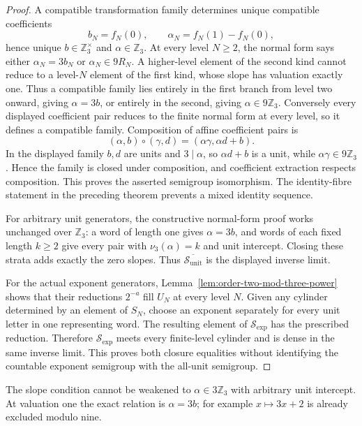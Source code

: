 \begin{proof}
A compatible transformation family determines unique compatible coefficients
\[
 b_N=f_N(0),
 \qquad \alpha_N=f_N(1)-f_N(0),
\]
hence unique $b\in\mathbb Z_3^\times$ and $\alpha\in\mathbb Z_3$.
At every level $N\geq2$, the normal form says either
$\alpha_N=3b_N$ or $\alpha_N\in9R_N$.  A higher-level element of the second
kind cannot reduce to a level-$N$ element of the first kind, whose slope has
valuation exactly one.  Thus a compatible family lies entirely in the first
branch from level two onward, giving $\alpha=3b$, or entirely in the second,
giving $\alpha\in9\mathbb Z_3$.  Conversely every displayed coefficient pair
reduces to the finite normal form at every level, so it defines a compatible
family.  Composition of affine coefficient pairs is
\[
 (\alpha,b)\circ(\gamma,d)=(\alpha\gamma,\alpha d+b).
\]
In the displayed family $b,d$ are units and $3\mid\alpha$, so
$\alpha d+b$ is a unit, while $\alpha\gamma\in9\mathbb Z_3$.  Hence the
family is closed under composition, and coefficient extraction respects
composition.  This proves the asserted semigroup isomorphism.  The
identity-fibre statement in the preceding theorem prevents a mixed identity
sequence.

For arbitrary unit generators, the constructive normal-form proof works
unchanged over $\mathbb Z_3$: a word of length one gives $\alpha=3b$, and
words of each fixed length $k\geq2$ give every pair with
$\nu_3(\alpha)=k$ and unit intercept.  Closing these strata adds exactly the
zero slopes.  Thus
$\overline{\mathcal S_{\mathrm{unit}}}$ is the displayed inverse limit.

For the actual exponent generators, Lemma~\ref{lem:order-two-mod-three-power}
shows that their reductions $2^{-a}$ fill $U_N$ at every level $N$.  Given
any cylinder determined by an element of $S_N$, choose an exponent separately
for every unit letter in one representing word.  The resulting element of
$\mathcal S_{\mathrm{exp}}$ has the prescribed reduction.  Therefore
$\mathcal S_{\mathrm{exp}}$ meets every finite-level cylinder and is dense in
the same inverse limit.  This proves both closure equalities without
identifying the countable exponent semigroup with the all-unit semigroup.
\end{proof}

The slope condition cannot be weakened to
$\alpha\in3\mathbb Z_3$ with arbitrary unit intercept.  At valuation one the
exact relation is $\alpha=3b$; for example $x\mapsto3x+2$ is already excluded
modulo nine.

